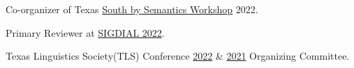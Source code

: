 Co-organizer of Texas \href{https://sites.google.com/utexas.edu/sxsw}{South by Semantics Workshop} 2022. 

Primary Reviewer at \href{https://2022.sigdial.org}{SIGDIAL 2022}.

Texas Linguistics Society(TLS) Conference \href{http://tls.ling.utexas.edu/2022/}{2022} \& \href{http://tls.ling.utexas.edu/2021/}{2021} Organizing Committee.